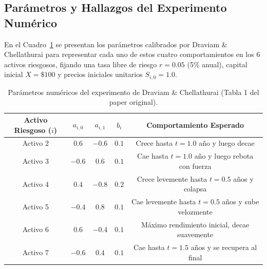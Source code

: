 \documentclass[11pt,a4paper]{report}
\numberwithin{equation}{chapter}
\begin{document}
\subsection{Parámetros y Hallazgos del Experimento Numérico}
En el Cuadro~\ref{tab:draviam_tabla1} se presentan los parámetros calibrados por Draviam \& Chellathurai para representar cada uno de estos cuatro comportamientos en los 6 activos riesgosos, fijando una tasa libre de riesgo $r = 0.05$ (5\% anual), capital inicial $X = \$100$ y precios iniciales unitarios $S_{i,0} = 1.0$.

\begin{table}[H]
\centering
\small
\renewcommand{\arraystretch}{1.2}
\begin{tabularx}{0.8\textwidth}{ccccc}
\toprule
\textbf{Activo Riesgoso ($i$)} & $a_{i,0}$ & $a_{i,1}$ & $b_i$ & \textbf{Comportamiento Esperado} \\
\midrule
Activo 2 & $0.6$  & $-0.6$ & $0.1$ & Crece hasta $t=1.0$ año y luego decae \\
Activo 3 & $-0.6$ & $0.6$  & $0.1$ & Cae hasta $t=1.0$ año y luego rebota con fuerza \\
Activo 4 & $0.4$  & $-0.8$ & $0.2$ & Crece levemente hasta $t=0.5$ años y colapsa \\
Activo 5 & $-0.4$ & $0.8$  & $0.1$ & Cae levemente hasta $t=0.5$ años y sube velozmente \\
Activo 6 & $0.6$  & $-0.4$ & $0.1$ & Máximo rendimiento inicial, decae suavemente \\
Activo 7 & $-0.6$ & $0.4$  & $0.1$ & Cae hasta $t=1.5$ años y se recupera al final \\
\bottomrule
\end{tabularx}
\caption{Parámetros numéricos del experimento de Draviam \& Chellathurai (Tabla 1 del paper original).}
\label{tab:draviam_tabla1}
\end{table}
\end{document}

